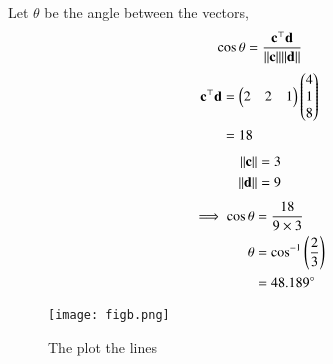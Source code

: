 \documentclass[journal,12pt,twocolumn]{IEEEtran}
\begin{document}
\begin{enumerate}
    Let $\theta$ be the angle between the vectors,
    \begin{align}
        \cos\theta = \frac{\mathbf{c}^\top \mathbf{d}}{\lVert\mathbf{c}\rVert {\lVert\mathbf{d}\rVert}}
    \end{align}
    \begin{align}
        \mathbf{c}^\top\mathbf{d}&=\begin{pmatrix}2&2&1\end{pmatrix}\begin{pmatrix}4\\1\\8\end{pmatrix}\\
                           &=18
    \end{align}
    \begin{align}
        \lVert\mathbf{c}\rVert &=3\\
        \lVert\mathbf{d}\rVert &=9
    \end{align}
    \begin{align}
        \implies \cos\theta & = \frac{18}{9\times 3}\\
          \theta &= \cos^{-1}\left(\frac{2}{3}\right)\\
                 &= 48.189\degree
    \end{align}
   \begin{figure}[!ht]
   \centering
   \texttt{[image: figb.png]}
   \caption{The plot the lines}
   \end{figure}
\end{enumerate}
    
\end{document}
